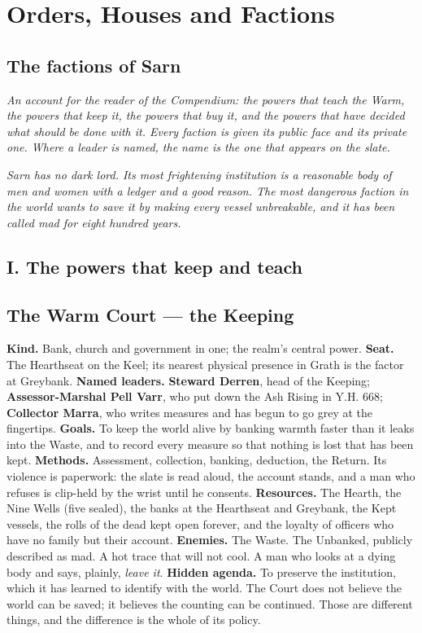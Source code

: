 \documentclass{design/chronicle}
\begin{document}
\chapter*{Orders, Houses and Factions}
\section*{The factions of Sarn}

\emph{An account for the reader of the Compendium: the powers that teach the Warm, the powers that keep it, the powers that buy it, and the powers that have decided what should be done with it. Every faction is given its public face and its private one. Where a leader is named, the name is the one that appears on the slate.}

\emph{Sarn has no dark lord. Its most frightening institution is a reasonable body of men and women with a ledger and a good reason. The most dangerous faction in the world wants to save it by making every vessel unbreakable, and it has been called mad for eight hundred years.}

\CRrule

\section*{I. The powers that keep and teach}

\section*{The Warm Court — the Keeping}

\textbf{Kind.} Bank, church and government in one; the realm’s central power. \textbf{Seat.} The Hearthseat on the Keel; its nearest physical presence in Grath is the factor at Greybank. \textbf{Named leaders.} \textbf{Steward Derren}, head of the Keeping; \textbf{Assessor-Marshal Pell Varr}, who put down the Ash Rising in Y.H. 668; \textbf{Collector Marra}, who writes measures and has begun to go grey at the fingertips. \textbf{Goals.} To keep the world alive by banking warmth faster than it leaks into the Waste, and to record every measure so that nothing is lost that has been kept. \textbf{Methods.} Assessment, collection, banking, deduction, the Return. Its violence is paperwork: the slate is read aloud, the account stands, and a man who refuses is clip-held by the wrist until he consents. \textbf{Resources.} The Hearth, the Nine Wells (five sealed), the banks at the Hearthseat and Greybank, the Kept vessels, the rolls of the dead kept open forever, and the loyalty of officers who have no family but their account. \textbf{Enemies.} The Waste. The Unbanked, publicly described as mad. A hot trace that will not cool. A man who looks at a dying body and says, plainly, \emph{leave it}. \textbf{Hidden agenda.} To preserve the institution, which it has learned to identify with the world. The Court does not believe the world can be saved; it believes the counting can be continued. Those are different things, and the difference is the whole of its policy.
\end{document}
